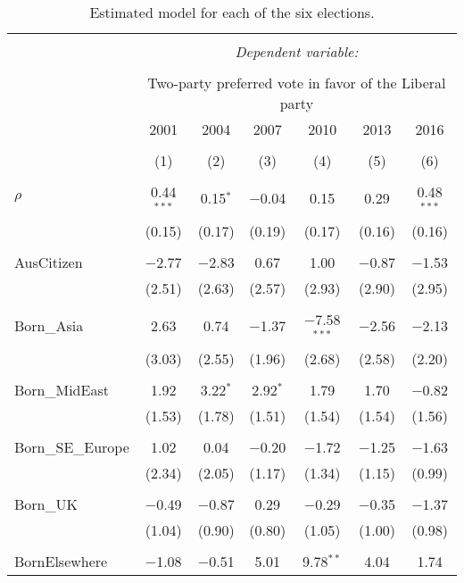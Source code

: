\documentclass[openany]{book}
\begin{document}
\begin{table}[!htbp] \centering 
  \caption{Estimated model for each of the six elections.} 
  \label{} 
\scriptsize 
\begin{tabular}{@{\extracolsep{1pt}}lcccccc} 
\\[-1.8ex]\hline 
\hline \\[-1.8ex] 
 & \multicolumn{6}{c}{\textit{Dependent variable:}} \\ 
\cline{2-7} 
\\[-1.8ex] & \multicolumn{6}{c}{Two-party preferred vote in favor of the Liberal party} \\ 
 & 2001 & 2004 & 2007 & 2010 & 2013 & 2016 \\ 
\\[-1.8ex] & (1) & (2) & (3) & (4) & (5) & (6)\\ 
\hline \\[-1.8ex] 
 $\rho$ & 0.44$^{***}$ & 0.15$^{*}$ & $-$0.04 & 0.15 & 0.29 & 0.48$^{***}$ \\ 
  & (0.15) & (0.17) & (0.19) & (0.17) & (0.16) & (0.16) \\ 
  & & & & & & \\ 
 AusCitizen & $-$2.77 & $-$2.83 & 0.67 & 1.00 & $-$0.87 & $-$1.53 \\ 
  & (2.51) & (2.63) & (2.57) & (2.93) & (2.90) & (2.95) \\ 
  & & & & & & \\ 
 Born\_Asia & 2.63 & 0.74 & $-$1.37 & $-$7.58$^{***}$ & $-$2.56 & $-$2.13 \\ 
  & (3.03) & (2.55) & (1.96) & (2.68) & (2.58) & (2.20) \\ 
  & & & & & & \\ 
 Born\_MidEast & 1.92 & 3.22$^{*}$ & 2.92$^{*}$ & 1.79 & 1.70 & $-$0.82 \\ 
  & (1.53) & (1.78) & (1.51) & (1.54) & (1.54) & (1.56) \\ 
  & & & & & & \\ 
 Born\_SE\_Europe & 1.02 & 0.04 & $-$0.20 & $-$1.72 & $-$1.25 & $-$1.63 \\ 
  & (2.34) & (2.05) & (1.17) & (1.34) & (1.15) & (0.99) \\ 
  & & & & & & \\ 
 Born\_UK & $-$0.49 & $-$0.87 & 0.29 & $-$0.29 & $-$0.35 & $-$1.37 \\ 
  & (1.04) & (0.90) & (0.80) & (1.05) & (1.00) & (0.98) \\ 
  & & & & & & \\ 
 BornElsewhere & $-$1.08 & $-$0.51 & 5.01 & 9.78$^{**}$ & 4.04 & 1.74 \\ 

\end{tabular}
\end{table}
\end{document}
